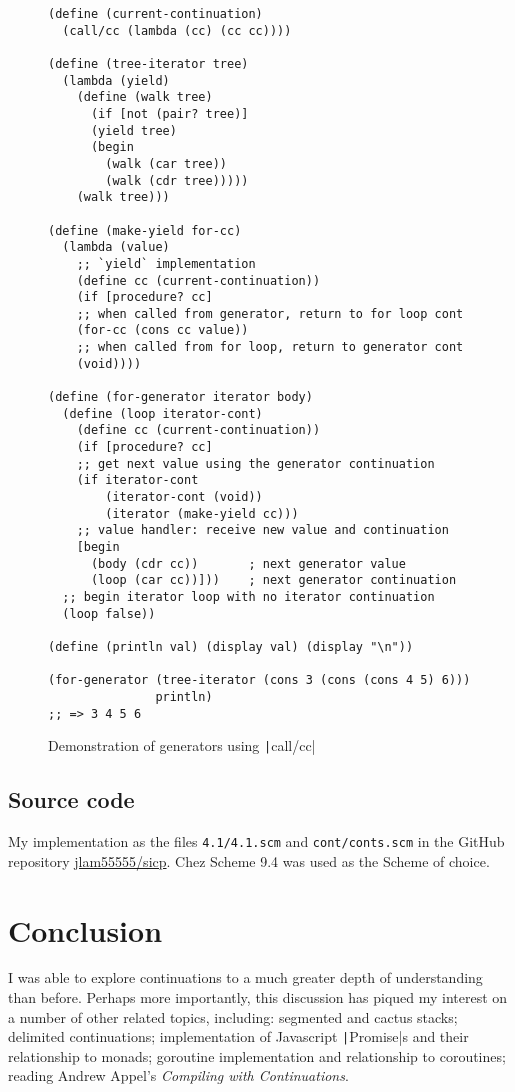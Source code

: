 \documentclass[]{article}
\begin{document}
\begin{figure}
  \centering
\begin{verbatim}
(define (current-continuation)
  (call/cc (lambda (cc) (cc cc))))

(define (tree-iterator tree)
  (lambda (yield)
    (define (walk tree)
      (if [not (pair? tree)]
	  (yield tree)
	  (begin
	    (walk (car tree))
	    (walk (cdr tree)))))
    (walk tree)))

(define (make-yield for-cc)
  (lambda (value)
    ;; `yield` implementation
    (define cc (current-continuation))
    (if [procedure? cc]
	;; when called from generator, return to for loop cont
	(for-cc (cons cc value))
	;; when called from for loop, return to generator cont
	(void))))

(define (for-generator iterator body)
  (define (loop iterator-cont)
    (define cc (current-continuation))
    (if [procedure? cc]
	;; get next value using the generator continuation
	(if iterator-cont
	    (iterator-cont (void))
	    (iterator (make-yield cc)))
	;; value handler: receive new value and continuation
	[begin
	  (body (cdr cc))       ; next generator value
	  (loop (car cc))]))    ; next generator continuation
  ;; begin iterator loop with no iterator continuation
  (loop false))

(define (println val) (display val) (display "\n"))

(for-generator (tree-iterator (cons 3 (cons (cons 4 5) 6)))
               println)
;; => 3 4 5 6
\end{verbatim}
  \caption{Demonstration of generators using \texttt|call/cc|}
  \label{fig:gene}
\end{figure}

\subsection{Source code}
\label{sec:sour}

My implementation as the files \texttt{4.1/4.1.scm} and \texttt{cont/conts.scm} in the GitHub repository \href{https://www.github.com/jlam55555/sicp}{jlam55555/sicp}. Chez Scheme 9.4 was used as the Scheme of choice.

\section{Conclusion}
\label{sec:conc}

I was able to explore continuations to a much greater depth of understanding than before. Perhaps more importantly, this discussion has piqued my interest on a number of other related topics, including: segmented and cactus stacks; delimited continuations; implementation of Javascript \texttt|Promise|s and their relationship to monads; goroutine implementation and relationship to coroutines; reading Andrew Appel's \textit{Compiling with Continuations}.
\end{document}
